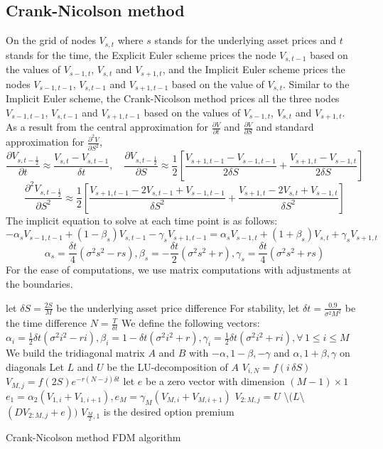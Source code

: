 \subsection{Crank-Nicolson method}
On the grid of nodes $V_{s,t}$ where $s$ stands for the underlying asset prices and $t$ stands for the time, the Explicit Euler scheme prices the node $V_{s,t-1}$ based on the values of $V_{s-1,t}$, $V_{s,t}$ and $V_{s+1,t}$, and the Implicit Euler scheme prices the nodes $V_{s-1,t-1}$, $V_{s,t-1}$ and $V_{s+1,t-1}$ based on the value of $V_{s,t}$. Similar to the Implicit Euler scheme, the Crank-Nicolson method prices all the three nodes $V_{s-1,t-1}$, $V_{s,t-1}$ and $V_{s+1,t-1}$ based on the values of $V_{s-1,t}$, $V_{s,t}$ and $V_{s+1,t}$.\\
As a result from the central approximation for $\displaystyle \frac{\partial V}{\partial t}$ and $\displaystyle \frac{\partial V}{\partial S}$ and standard approximation for $\displaystyle \frac{\partial^{2} V}{\partial S^{2}}$,
$$\frac{\partial V_{s, t-\frac{1}{2}}}{\partial t} \approx \frac{V_{s,t}-V_{s,t-1}}{\delta t}, \quad \frac{\partial V_{s, t-\frac{1}{2}}}{\partial S} \approx \frac{1}{2}[\frac{V_{s+1,t-1}-V_{s-1,t-1}}{2\delta S} + \frac{V_{s+1,t}-V_{s-1,t}}{2\delta S}]$$
$$\frac{\partial^{2} V_{s, t-\frac{1}{2}}}{\partial S^{2}} \approx \frac{1}{2}[\frac{V_{s+1,t-1}-2V_{s,t-1}+V_{s-1,t-1}}{\delta S^{2}} + \frac{V_{s+1,t}-2V_{s,t}+V_{s-1,t}}{\delta S^{2}}]$$
The implicit equation to solve at each time point is as follows:
$$-\alpha_{s}V_{s-1,t-1} + (1-\beta_{s})V_{s,t-1} - \gamma_{s}V_{s+1,t-1} = \alpha_{s}V_{s-1,t} + (1+\beta_{s})V_{s,t} + \gamma_{s}V_{s+1,t}$$
$$\alpha_{s} = \frac{\delta t}{4}(\sigma^{2}s^{2} - rs), \beta_{s} = -\frac{\delta t}{2}(\sigma^{2}s^{2} + r), \gamma_{s} = \frac{\delta t}{4}(\sigma^{2}s^{2} + rs)$$
For the ease of computations, we use matrix computations with adjustments at the boundaries.\\[3mm]
\begin{algorithm}[H]
 let $\delta S = \frac{2S}{M}$ be the underlying asset price difference \;
 For stability, let $\delta t = \frac{0.9}{\sigma^{2}M^{2}}$ be the time difference\;
 $N = \frac{T}{\delta t}$\;
 We define the following vectors:\\
 $\alpha_{i} = \frac{1}{2}\delta t(\sigma^{2}i^{2} - ri), \beta_{i} = 1-\delta t(\sigma^{2}i^{2} + r), \gamma_{i} = \frac{1}{2}\delta t(\sigma^{2}i^{2} + ri), \forall \, 1 \le i \le M$\;
 We build the tridiagonal matrix $A$ and $B$ with $-\alpha, 1-\beta, -\gamma$ and $\alpha, 1+\beta, \gamma$ on diagonals\;
 Let $L$ and $U$ be the LU-decomposition of $A$\;
  {
  $V_{i, N} = f(i\,\delta S)$\;
 }
  {
  $V_{M, j} = f(2S)e^{-r(N-j)\delta t}$\;
 }
 let $e$ be a zero vector with dimension $(M-1) \times 1$\;
  {
  $e_{1} = \alpha_{2}(V_{1,i}+V_{1,i+1}), e_{M} = \gamma_{M}(V_{M,i}+V_{M,i+1})$\;
  $V_{2:M, j} = U$ \textbackslash $(L$\textbackslash$(D V_{2:M,j}+e))$\;
 }
 $V_{\frac{M}{2},1}$ is the desired option premium\;
\caption{Crank-Nicolson method FDM algorithm}
\end{algorithm}
\newpage

